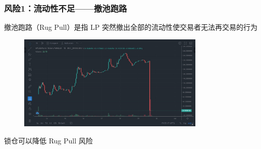 \documentclass{beamer}
\begin{document}
\begin{frame}
    \frametitle{风险1：流动性不足——撤池跑路}

    撤池跑路（Rug Pull）是指 LP 突然撤出全部的流动性使交易者无法再交易的行为

    \begin{figure}
        \centering
    \includegraphics[width=0.8\textwidth]{../notes/rugpull.jpeg}
    \end{figure}

    锁仓可以降低 Rug Pull 风险

\end{frame}
\end{document}

